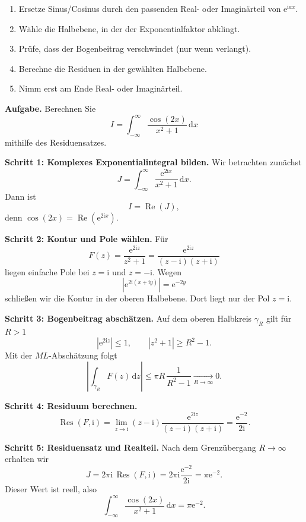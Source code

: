 \documentclass[11pt,a4paper]{article}
\newcommand{\ii}{\mathrm i}
\newcommand{\ee}{\mathrm e}
\newcommand{\dd}{\,\mathrm d}
\newcommand{\Res}{\operatorname{Res}}
\newcommand{\Ree}{\operatorname{Re}}
\newcommand{\1}{\mathbf 1}
\begin{document}
{\begin{kochrezeptbox}[title=Reelles Fourier-artiges Integral mit Residuen]
\begin{enumerate}
\item Ersetze Sinus/Cosinus durch den passenden Real- oder Imaginärteil von
$\ee^{\ii ax}$.
\item Wähle die Halbebene, in der der Exponentialfaktor abklingt.
\item Prüfe, dass der Bogenbeitrag verschwindet (nur wenn verlangt).
\item Berechne die Residuen in der gewählten Halbebene.
\item Nimm erst am Ende Real- oder Imaginärteil.
\end{enumerate}
\end{kochrezeptbox}

\begin{beispielbox}[title={Vorgerechnetes Beispiel: reelles Fourier-artiges Integral}]
\textbf{Aufgabe.} Berechnen Sie
\[
I=\int_{-\infty}^{\infty}\frac{\cos(2x)}{x^2+1}\dd x
\]
mithilfe des Residuensatzes.

\textbf{Schritt 1: Komplexes Exponentialintegral bilden.}
Wir betrachten zunächst
\[
J=\int_{-\infty}^{\infty}\frac{\ee^{2\ii x}}{x^2+1}\dd x.
\]
Dann ist
\[
I=\Ree(J),
\]
denn $\cos(2x)=\Ree(\ee^{2\ii x})$.

\textbf{Schritt 2: Kontur und Pole wählen.}
Für
\[
F(z)=\frac{\ee^{2\ii z}}{z^2+1}
=\frac{\ee^{2\ii z}}{(z-\ii)(z+\ii)}
\]
liegen einfache Pole bei $z=\ii$ und $z=-\ii$. Wegen
\[
\left|\ee^{2\ii(x+\ii y)}\right|=\ee^{-2y}
\]
schließen wir die Kontur in der oberen Halbebene. Dort liegt nur der Pol
$z=\ii$.

\textbf{Schritt 3: Bogenbeitrag abschätzen.}
Auf dem oberen Halbkreis $\gamma_R$ gilt für $R>1$
\[
\left|\ee^{2\ii z}\right|\leq1,
\qquad
|z^2+1|\geq R^2-1.
\]
Mit der $ML$-Abschätzung folgt
\[
\left|\int_{\gamma_R}F(z)\dd z\right|
\leq\pi R\,\frac1{R^2-1}
\xrightarrow[R\to\infty]{}0.
\]

\textbf{Schritt 4: Residuum berechnen.}
\[
\Res(F,\ii)
=\lim_{z\to\ii}(z-\ii)
\frac{\ee^{2\ii z}}{(z-\ii)(z+\ii)}
=\frac{\ee^{-2}}{2\ii}.
\]

\textbf{Schritt 5: Residuensatz und Realteil.}
Nach dem Grenzübergang $R\to\infty$ erhalten wir
\[
J=2\pi\ii\,\Res(F,\ii)
=2\pi\ii\frac{\ee^{-2}}{2\ii}
=\pi\ee^{-2}.
\]
Dieser Wert ist reell, also
\[
\boxed{
\int_{-\infty}^{\infty}\frac{\cos(2x)}{x^2+1}\dd x
=\pi\ee^{-2}.
}
\]
\end{beispielbox}

}
\end{document}
